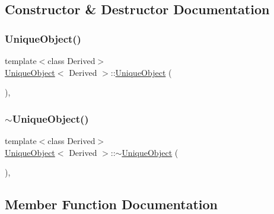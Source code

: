\subsection{Constructor \& Destructor Documentation}
\mbox{\label{class_unique_object_abce35af1a7300394a8f0338fb5aec1bb}} 
\subsubsection{\texorpdfstring{Unique\+Object()}{UniqueObject()}}
{\footnotesize\ttfamily template$<$class Derived$>$ \\
\mbox{\hyperlink{class_unique_object}{Unique\+Object}}$<$ Derived $>$\+::\mbox{\hyperlink{class_unique_object}{Unique\+Object}} (\begin{DoxyParamCaption}{ }\end{DoxyParamCaption})\hspace{0.3cm}{\ttfamily [inline]}, {\ttfamily [protected]}}

\mbox{\label{class_unique_object_ae8d2473ec0491d22b29eb05747b492dd}} 
\subsubsection{\texorpdfstring{$\sim$\+Unique\+Object()}{~UniqueObject()}}
{\footnotesize\ttfamily template$<$class Derived$>$ \\
\mbox{\hyperlink{class_unique_object}{Unique\+Object}}$<$ Derived $>$\+::$\sim$\mbox{\hyperlink{class_unique_object}{Unique\+Object}} (\begin{DoxyParamCaption}{ }\end{DoxyParamCaption})\hspace{0.3cm}{\ttfamily [inline]}, {\ttfamily [protected]}}



\subsection{Member Function Documentation}
\mbox{\label{class_unique_object_ae2eb65234b1b3d9574d5e7c8c11be27c}} 
